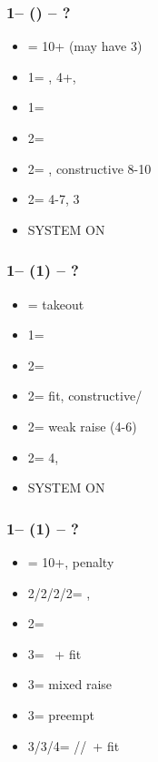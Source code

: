 \documentclass[12pt, a4paper]{report}
\begin{document}
\subsubsection*{1\hearts -- (\dbl) -- ?}
\begin{itemize}
    \item \rdbl = 10+ (may have 3\hearts)
    \item 1\spades = \nat, 4+\spades, \fonce
    \item 1\nt = \trsf{2\clubs}
    \item 2\clubs = \trsf{2\diams}
    \item 2\diams = \trsf{2\hearts}, constructive 8-10
    \item 2\hearts = 4-7, 3\hearts
    \item \small{SYSTEM ON}
\end{itemize}

\subsubsection*{1\hearts -- (1\spades) -- ?}
\begin{itemize}
    \item \dbl = takeout
    \item 1\nt = \clubs
    \item 2\clubs = \diams
    \item 2\diams = fit, constructive/\gf
    \item 2\hearts = weak raise (4-6)
    \item 2\spades = 4\hearts, \inv
    \item \small{SYSTEM ON}
\end{itemize}

\subsubsection*{1\hearts -- (1\nt) -- ?}
\begin{itemize}
    \item \dbl = 10+, penalty
    \item 2\clubs/2\diams/2\hearts/2\spades = \nat, \nf
    \item 2\nt = \minor
    \item 3\clubs = \inv\ + fit
    \item 3\diams = mixed raise
    \item 3\hearts = preempt
    \item 3\spades/3\nt/4\clubs = \spades/\diams/\clubs\ + fit
\end{itemize}
\end{document}
